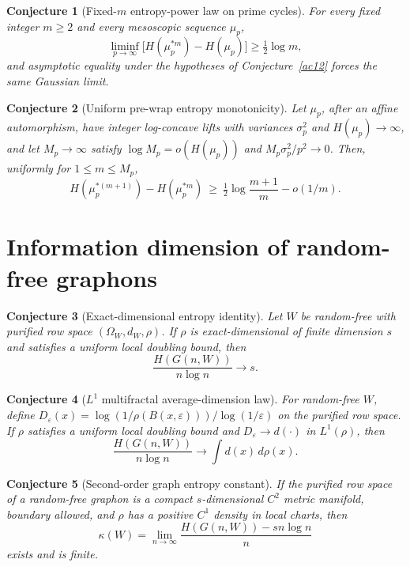 \documentclass[11pt]{article}
\newtheorem{conjecture}{Conjecture}
\theoremstyle{definition}
\begin{document}
\begin{conjecture}[Fixed-$m$ entropy-power law on prime cycles]\label{ac14}
For every fixed integer $m\ge2$ and every mesoscopic sequence $\mu_p$,
\[
\liminf_{p\to\infty}\bigl[H(\mu_p^{*m})-H(\mu_p)\bigr]\ge\tfrac12\log m,
\]
and asymptotic equality under the hypotheses of Conjecture~\ref{ac12} forces the same Gaussian limit.
\end{conjecture}

\begin{conjecture}[Uniform pre-wrap entropy monotonicity]\label{ac15}
Let $\mu_p$, after an affine automorphism, have integer log-concave lifts with variances $\sigma_p^2$ and $H(\mu_p)\to\infty$, and let $M_p\to\infty$ satisfy $\log M_p=o(H(\mu_p))$ and $M_p\sigma_p^2/p^2\to0$.  Then, uniformly for $1\le m\le M_p$,
\[
H(\mu_p^{*(m+1)})-H(\mu_p^{*m})\ \ge\ \tfrac12\log\frac{m+1}m-o(1/m).
\]
\end{conjecture}

\section{Information dimension of random-free graphons}

\begin{conjecture}[Exact-dimensional entropy identity]\label{ac16}
Let $W$ be random-free with purified row space $(\Omega_W,d_W,\rho)$.  If $\rho$ is exact-dimensional of finite dimension $s$ and satisfies a uniform local doubling bound, then
\[
\frac{H(G(n,W))}{n\log n}\longrightarrow s.
\]
\end{conjecture}

\begin{conjecture}[$L^1$ multifractal average-dimension law]\label{ac17}
For random-free $W$, define $D_\varepsilon(x)=\log(1/\rho(B(x,\varepsilon)))/\log(1/\varepsilon)$ on the purified row space.  If $\rho$ satisfies a uniform local doubling bound and $D_\varepsilon\to d(\cdot)$ in $L^1(\rho)$, then
\[
\frac{H(G(n,W))}{n\log n}\longrightarrow\int d(x)\,d\rho(x).
\]
\end{conjecture}

\begin{conjecture}[Second-order graph entropy constant]\label{ac18}
If the purified row space of a random-free graphon is a compact $s$-dimensional $C^2$ metric manifold, boundary allowed, and $\rho$ has a positive $C^1$ density in local charts, then
\[
\kappa(W)=\lim_{n\to\infty}\frac{H(G(n,W))-sn\log n}{n}
\]
exists and is finite.
\end{conjecture}
\end{document}
